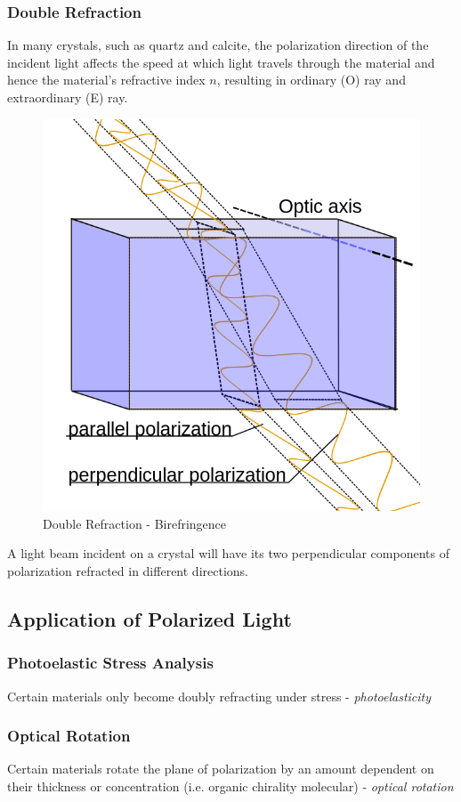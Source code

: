 \documentclass[UTF8]{book}
\begin{document}
\subsubsection{Double Refraction}
In many crystals, such as quartz and calcite, the polarization direction of the incident light affects the speed at which light travels through the material and hence the material's refractive index $n$, resulting in ordinary (O) ray and extraordinary (E) ray.
\begin{figure}[H]
\centering
\label{fig:16}
\includegraphics[scale=0.25]{Figure/16.PNG}
\caption{Double Refraction - Birefringence}
\end{figure}
A light beam incident on a crystal will have its two perpendicular components of polarization refracted in different directions.
\subsection{Application of Polarized Light}
\subsubsection{Photoelastic Stress Analysis}
Certain materials only become doubly refracting under stress - \emph{photoelasticity}
\subsubsection{Optical Rotation}
Certain materials rotate the plane of polarization by an amount dependent on their thickness or concentration (i.e. organic chirality molecular) - \emph{optical rotation}
\end{document}
